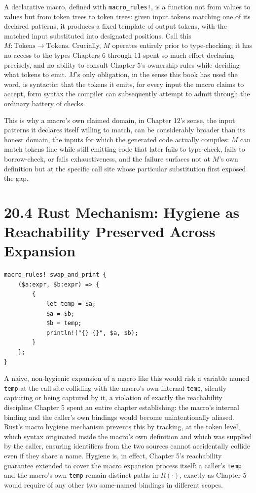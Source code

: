 \documentclass[11pt]{book}
\begin{document}
A declarative macro, defined with \texttt{macro\_rules!}, is a function not from values to values but from token trees to token trees: given input tokens matching one of its declared patterns, it produces a fixed template of output tokens, with the matched input substituted into designated positions. Call this $M: \mathrm{Tokens} \rightarrow \mathrm{Tokens}$. Crucially, $M$ operates entirely prior to type-checking; it has no access to the types Chapters 6 through 11 spent so much effort declaring precisely, and no ability to consult Chapter 5's ownership rules while deciding what tokens to emit. $M$'s only obligation, in the sense this book has used the word, is syntactic: that the tokens it emits, for every input the macro claims to accept, form syntax the compiler can subsequently attempt to admit through the ordinary battery of checks.

This is why a macro's own claimed domain, in Chapter 12's sense, the input patterns it declares itself willing to match, can be considerably broader than its honest domain, the inputs for which the generated code actually compiles: $M$ can match tokens fine while still emitting code that later fails to type-check, fails to borrow-check, or fails exhaustiveness, and the failure surfaces not at $M$'s own definition but at the specific call site whose particular substitution first exposed the gap.

\section*{20.4 Rust Mechanism: Hygiene as Reachability Preserved Across Expansion}

\begin{lstlisting}
macro_rules! swap_and_print {
    ($a:expr, $b:expr) => {
        {
            let temp = $a;
            $a = $b;
            $b = temp;
            println!("{} {}", $a, $b);
        }
    };
}
\end{lstlisting}

A naive, non-hygienic expansion of a macro like this would risk a variable named \texttt{temp} at the call site colliding with the macro's own internal \texttt{temp}, silently capturing or being captured by it, a violation of exactly the reachability discipline Chapter 5 spent an entire chapter establishing: the macro's internal binding and the caller's own bindings would become unintentionally aliased. Rust's macro hygiene mechanism prevents this by tracking, at the token level, which syntax originated inside the macro's own definition and which was supplied by the caller, ensuring identifiers from the two sources cannot accidentally collide even if they share a name. Hygiene is, in effect, Chapter 5's reachability guarantee extended to cover the macro expansion process itself: a caller's \texttt{temp} and the macro's own \texttt{temp} remain distinct paths in $R(\cdot)$, exactly as Chapter 5 would require of any other two same-named bindings in different scopes.
\end{document}
